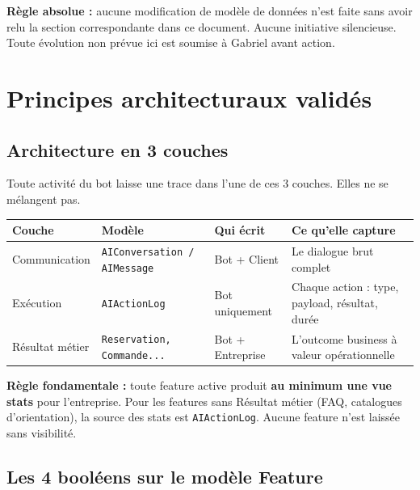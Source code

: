 \documentclass[11pt,a4paper]{article}
\newcommand{\slug}[1]{\texttt{\color{AGTDark}#1}}
\begin{document}
\begin{warnbox}
\textbf{Règle absolue :} aucune modification de modèle de données n'est faite sans
avoir relu la section correspondante dans ce document. Aucune initiative silencieuse.
Toute évolution non prévue ici est soumise à Gabriel avant action.
\end{warnbox}

\section{Principes architecturaux validés}

\subsection{Architecture en 3 couches}

Toute activité du bot laisse une trace dans l'une de ces 3 couches. Elles ne se
mélangent pas.

\begin{center}
\begin{tabularx}{\textwidth}{lllX}
\toprule
\textbf{Couche} & \textbf{Modèle} & \textbf{Qui écrit} & \textbf{Ce qu'elle capture} \\
\midrule
Communication & \slug{AIConversation / AIMessage} & Bot + Client & Le dialogue brut complet \\[4pt]
Exécution & \slug{AIActionLog} & Bot uniquement & Chaque action : type, payload, résultat, durée \\[4pt]
Résultat métier & \slug{Reservation, Commande...} & Bot + Entreprise & L'outcome business à valeur opérationnelle \\
\bottomrule
\end{tabularx}
\end{center}

\begin{notebox}
\textbf{Règle fondamentale :} toute feature active produit \textbf{au minimum une vue
stats} pour l'entreprise. Pour les features sans Résultat métier (FAQ, catalogues
d'orientation), la source des stats est \slug{AIActionLog}. Aucune feature n'est
laissée sans visibilité.
\end{notebox}

\subsection{Les 4 booléens sur le modèle Feature}
\end{document}
